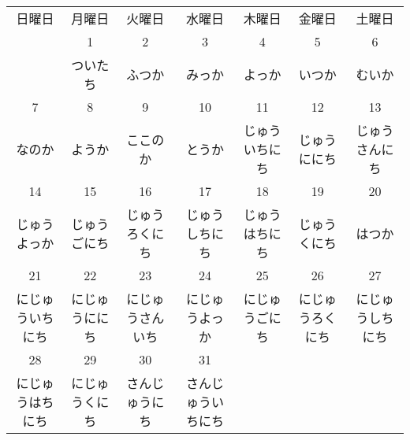 \documentclass[notoc,notitlepage]{tufte-book}
\begin{document}

\begin{fullwidth}
\begin{tabular}{c c c c c c c}
日曜日                          & 月曜日                        & 火曜日                          & 水曜日                            & 木曜日                        & 金曜日                          & 土曜日 \\
                                & 1                             & 2                               & 3                                 & 4                             & 5                               & 6 \\
                                & ついたち                      & ふつか                          & みっか                            & よっか                        & いつか                          & むいか \\
7                               & 8                             & 9                               & 10                                & 11                            & 12                              & 13 \\
なのか                          & ようか                        & ここのか                        & とうか                            & \scriptsize{ じゅういちにち } & \scriptsize{ じゅうににち }     & \scriptsize{ じゅうさんにち } \\
14                              & 15                            & 16                              & 17                                & 18                            & 19                              & 20 \\
\scriptsize{ じゅうよっか }     & \scriptsize{ じゅうごにち }   & \scriptsize{ じゅうろくにち }   & \scriptsize{ じゅうしちにち }     & \scriptsize{ じゅうはちにち } & \scriptsize{ じゅうくにち }     & はつか \\
21                              & 22                            & 23                              & 24                                & 25                            & 26                              & 27 \\
\scriptsize{ にじゅういちにち } & \scriptsize{ にじゅうににち } & \scriptsize{ にじゅうさんいち } & \scriptsize{ にじゅうよっか }     & \scriptsize{ にじゅうごにち } & \scriptsize{ にじゅうろくにち } & \scriptsize{ にじゅうしちにち } \\
28                              & 29                            & 30                              & 31 \\
\scriptsize{ にじゅうはちにち } & \scriptsize{ にじゅうくにち } & \scriptsize{ さんじゅうにち }   & \scriptsize{ さんじゅういちにち }
\end{tabular}
\end{fullwidth}


\nobibliography*


\printindex
\end{document}
